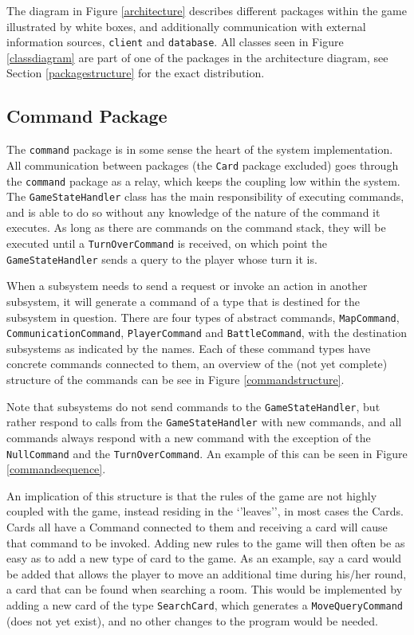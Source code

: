 The diagram in Figure \ref{architecture} describes different packages within the game illustrated by white boxes, and additionally communication with external information sources, \texttt{client} and \texttt{database}. All classes seen in Figure \ref{classdiagram} are part of one of the packages in the architecture diagram, see Section \ref{packagestructure} for the exact distribution.


\subsection{Command Package}
The \texttt{command} package is in some sense the heart of the system implementation. All communication between packages (the \texttt{Card} package excluded) goes through the \texttt{command} package as a relay, which keeps the coupling low within the system. The \texttt{GameStateHandler} class has the main responsibility of executing commands, and is able to do so without any knowledge of the nature of the command it executes. As long as there are commands on the command stack, they will be executed until a \texttt{TurnOverCommand} is received, on which point the \texttt{GameStateHandler} sends a query to the player whose turn it is.

When a subsystem needs to send a request or invoke an action in another subsystem, it will generate a command of a type that is destined for the subsystem in question. There are four types of abstract commands, \texttt{MapCommand}, \texttt{CommunicationCommand}, \texttt{PlayerCommand} and \texttt{BattleCommand}, with the destination subsystems as indicated by the names. Each of these command types have concrete commands connected to them, an overview of the (not yet complete) structure of the commands can be see in Figure \ref{commandstructure}.

Note that subsystems do not send commands to the \texttt{GameStateHandler}, but rather respond to calls from the \texttt{GameStateHandler} with new commands, and all commands always respond with a new command with the exception of the \texttt{NullCommand} and the \texttt{TurnOverCommand}. An example of this can be seen in Figure \ref{commandsequence}.

An implication of this structure is that the rules of the game are not highly coupled with the game, instead residing in the ‘’leaves’’, in most cases the Cards. Cards all have a Command connected to them and receiving a card will cause that command to be invoked. Adding new rules to the game will then often be as easy as to add a new type of card to the game. As an example, say a card would be added that allows the player to move an additional time during his/her round, a card that can be found when searching a room. This would be implemented by adding a new card of the type \texttt{SearchCard}, which generates a \texttt{MoveQueryCommand} (does not yet exist), and no other changes to the program would be needed.


